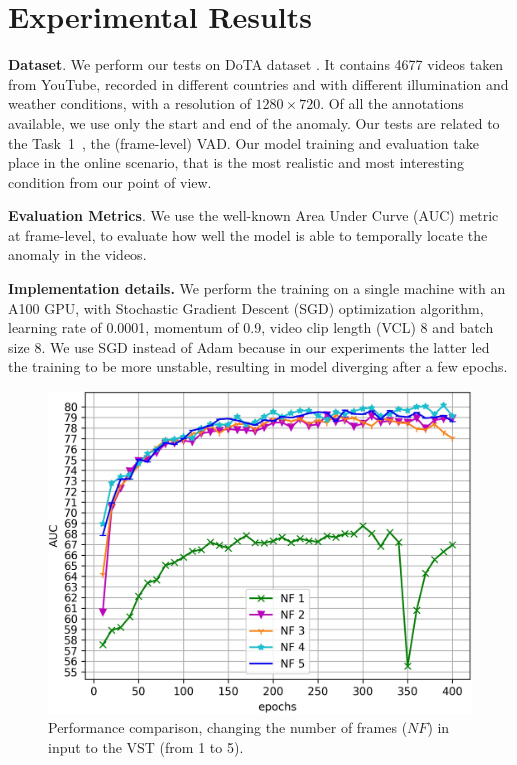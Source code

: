 \section{Experimental Results}
\label{sec:experiments}


\noindent\textbf{Dataset}.
We perform our tests on DoTA dataset \cite{9712446}.
It contains 4677 videos taken from YouTube, recorded in different countries and with different illumination and weather conditions, with a resolution of $1280 \times 720$.
Of all the annotations available, we use only the start and end of the anomaly.
Our tests are related to the Task~1~\cite{9712446}, the (frame-level) VAD.
Our model training and evaluation take place in the online scenario, that is the most realistic and most interesting condition from our point of view.

\noindent\textbf{Evaluation Metrics}.
We use the well-known Area Under Curve (AUC) metric at frame-level, to evaluate how well the model is able to temporally locate the anomaly in the videos.

\noindent\textbf{Implementation details.}
We perform the training on a single machine with an A100 GPU\@, with Stochastic Gradient Descent (SGD) optimization algorithm, learning rate of 0.0001, momentum of 0.9, video clip length (VCL) 8 and batch size 8.
We use SGD instead of Adam because in our experiments the latter led the training to be more unstable, resulting in model diverging after a few epochs.

\newcommand{\figsize}{0.7\columnwidth}

\begin{figure}[ht!]
\centerline{\includegraphics[clip,width=\figsize]{images/exp_1.jpg}}
	\caption{Performance comparison, changing the number of frames ($\mathit{NF}$) in input to the VST (from 1 to 5).}
	\label{fig:num-frames-vst}
\end{figure}


